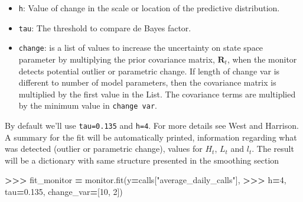 \documentclass[
]{article}
\newenvironment{Shaded}{\begin{snugshade}}{\end{snugshade}}
\newcommand{\DecValTok}[1]{\textcolor[rgb]{0.00,0.00,0.81}{#1}}
\newcommand{\FloatTok}[1]{\textcolor[rgb]{0.00,0.00,0.81}{#1}}
\newcommand{\NormalTok}[1]{#1}
\newcommand{\OperatorTok}[1]{\textcolor[rgb]{0.81,0.36,0.00}{\textbf{#1}}}
\newcommand{\StringTok}[1]{\textcolor[rgb]{0.31,0.60,0.02}{#1}}
\providecommand{\tightlist}{%
  \setlength{\itemsep}{0pt}\setlength{\parskip}{0pt}}
\begin{document}
\begin{itemize}
\tightlist
\item
  \texttt{h}: Value of change in the scale or location of the predictive
  distribution.
\item
  \texttt{tau}: The threshold to compare de Bayes factor.
\item
  \texttt{change}: is a list of values to increase the uncertainty on
  state space parameter by multiplying the prior covariance matrix,
  \(\mathbf{R}_t\), when the monitor detects potential outlier or
  parametric change. If length of change var is different to number of
  model parameters, then the covariance matrix is multiplied by the
  first value in the List. The covariance terms are multiplied by the
  minimum value in \texttt{change\ var}.
\end{itemize}

By default we'll use \texttt{tau=0.135} and \texttt{h=4}. For more
details see West and Harrison. A summary for the fit will be
automatically printed, information regarding what was detected (outlier
or parametric change), values for \(H_t\), \(L_t\) and \(l_t\). The
result will be a dictionary with same structure presented in the
smoothing section

\begin{Shaded}
\begin{Highlighting}[]
\OperatorTok{\textgreater{}\textgreater{}\textgreater{}}\NormalTok{ fit\_monitor }\OperatorTok{=}\NormalTok{ monitor.fit(y}\OperatorTok{=}\NormalTok{calls[}\StringTok{"average\_daily\_calls"}\NormalTok{], }
\OperatorTok{\textgreater{}\textgreater{}\textgreater{}}\NormalTok{ h}\OperatorTok{=}\DecValTok{4}\NormalTok{, tau}\OperatorTok{=}\FloatTok{0.135}\NormalTok{, change\_var}\OperatorTok{=}\NormalTok{[}\DecValTok{10}\NormalTok{, }\DecValTok{2}\NormalTok{])}
\end{Highlighting}
\end{Shaded}
\end{document}
